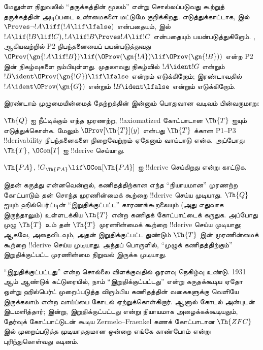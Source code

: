 \documentclass[../../../include/open-logic-section]{subfiles}
\begin{document}
மேலுள்ள நிறுவலில் “தருக்கத்தின் மூலம்” என்று சொல்லப்படுவது
கூற்றுத் தருக்கத்தின் அடிப்படை உண்மைகளை மட்டுமே குறிக்கிறது.
எடுத்துக்காட்டாக,  இல்
$\Proves \lnot!A \liff (!A\lif\lfalse)$ என்பதையும்,
 இல்
$!A \lif (!B \lif !C), !A \lif !B \Proves !A \lif !C$
என்பதையும் பயன்படுத்துகிறோம். ,  ஆகியவற்றில்
P2 நிபந்தனையைப் பயன்படுத்துவது
$\OProv(\gn{!A \lif !B}) \lif
(\OProv(\gn{!A}) \lif \OProv(\gn{!B}))$ என்ற P2 இன் நிகழ்வுகளை
நம்பியுள்ளது. முதலாவது நிகழ்வில் $!A \ident !G$ என்றும்
$!B \ident \OProv(\gn{!G}) \lif \lfalse$ என்றும் எடுக்கிறோம்;
இரண்டாவதில் $!A \ident \OProv(\gn{G})$ என்றும்
$!B \ident \lfalse$ என்றும் எடுக்கிறோம்.

இரண்டாம் முழுமையின்மைத் தேற்றத்தின் இன்னும் பொதுவான வடிவம்
பின்வருமாறு:

\begin{thm}
$\Th{Q}$ ஐ நீட்டிக்கும் எந்த முரணற்ற, !!{axiomatized} கோட்பாடான
$\Th{T}$ ஐயும் எடுத்துக்கொள்க. மேலும்
$\OProv[\Th{T}](y)$ என்பது $\Th{T}$ க்கான P1--P3
!!{derivability} நிபந்தனைகளை நிறைவேற்றும் ஏதேனும் வாய்பாடு என்க.
அப்போது $\Th{T}$, $\OCon[T]$ ஐ !!{derive} செய்யாது.
\end{thm}

\begin{prob}
$\Th{PA}$, $!G_{\Th{PA}} \lif \OCon[\Th{PA}]$ ஐ !!{derive} செய்கிறது
என்று காட்டுக.
\end{prob}

\begin{digress}
இதன் கருத்து என்னவென்றால், கணிதத்திற்கான எந்த “நியாயமான” முரணற்ற
கோட்பாடும் தன் சொந்த முரணின்மைக் கூற்றை !!{derive} செய்ய முடியாது.
$\Th{Q}$ ஐயும் ஹில்பெர்ட்டின் “இறுதிக்குட்பட்ட” காரணங்கூறலையும்
(அது எதுவாக இருந்தாலும்) உள்ளடக்கிய $\Th{T}$ என்ற கணிதக்
கோட்பாட்டைக் கருதுக. அப்போது முழு $\Th{T}$ உம் தன்
$\Th{T}$ முரணின்மைக்
கூற்றை !!{derive} செய்ய முடியாது; ஆகவே, அதைவிடவும், அதன்
இறுதிக்குட்பட்ட துண்டும் $\Th{T}$ இன் முரணின்மைக் கூற்றை !!{derive}
செய்ய முடியாது. அந்தப் பொருளில், “முழுக் கணிதத்திற்கும்”
இறுதிக்குட்பட்ட முரணின்மை நிறுவல் இருக்க முடியாது.

“இறுதிக்குட்பட்டது” என்ற சொல்லை விளக்குவதில் ஓரளவு நெகிழ்வு உண்டு.
1931 ஆம் ஆண்டுக் கட்டுரையில், நாம் “இறுதிக்குட்பட்டது” என்று
கருதக்கூடிய ஏதோ ஒன்று ஹில்பெர்ட் முறைப்படுத்த விரும்பிய கணிதத்தின்
வகைகளுக்கு வெளியே இருக்கலாம் என்ற வாய்ப்பை கோடல் ஏற்றுக்கொள்கிறார்.
ஆனால் கோடல் அன்புடன் இடமளித்தார்; இன்று, இறுதிக்குட்பட்டது என்று
நியாயமாக அழைக்கக்கூடியதும், தேர்வுக் கோட்பாட்டுடன் கூடிய
Zermelo--Fraenkel கணக் கோட்பாடான $\Th{ZFC}$ இல் முறைப்படுத்த
முடியாததுமான ஒன்றை எங்கே காண்போம் என்று புரிந்துகொள்வது கடினம்.
\end{digress}
\end{document}
